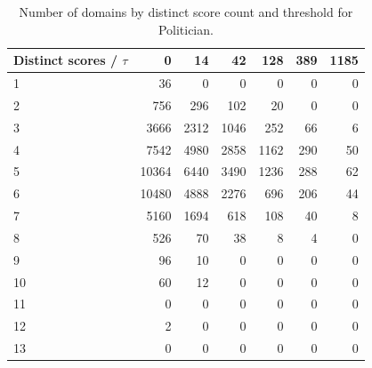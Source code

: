 \begin{table}[htbp]
\centering
\small
\begin{tabular}{l r r r r r r}
\hline
Distinct scores / $\tau$ & 0 & 14 & 42 & 128 & 389 & 1185 \\
\hline
1 & 36 & 0 & 0 & 0 & 0 & 0 \\
2 & 756 & 296 & 102 & 20 & 0 & 0 \\
3 & 3666 & 2312 & 1046 & 252 & 66 & 6 \\
4 & 7542 & 4980 & 2858 & 1162 & 290 & 50 \\
5 & 10364 & 6440 & 3490 & 1236 & 288 & 62 \\
6 & 10480 & 4888 & 2276 & 696 & 206 & 44 \\
7 & 5160 & 1694 & 618 & 108 & 40 & 8 \\
8 & 526 & 70 & 38 & 8 & 4 & 0 \\
9 & 96 & 10 & 0 & 0 & 0 & 0 \\
10 & 60 & 12 & 0 & 0 & 0 & 0 \\
11 & 0 & 0 & 0 & 0 & 0 & 0 \\
12 & 2 & 0 & 0 & 0 & 0 & 0 \\
13 & 0 & 0 & 0 & 0 & 0 & 0 \\
\hline
\end{tabular}
\caption{Number of domains by distinct score count and threshold for Politician.}
\label{tab:distinct-scores-Politician}
\end{table}
